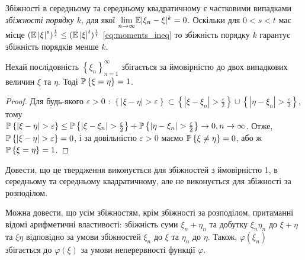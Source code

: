 \begin{remark}
    Збіжності в середньому та середньому квадратичному є частковими випадками \emph{збіжності порядку $k$}, для якої
$\underset{n \to \infty}{\lim} \E|\xi_n - \xi|^k = 0$. Оскільки 
для $0 < s < t$ має місце
$( \E \left| \xi\right|^s)^{\frac{1}{s}} \leq ( \E \left| \xi\right|^t)^{\frac{1}{t}}$ \eqref{eq:moments_ineq}
то збіжність порядку $k$ гарантує збіжність порядків менше $k$.
\end{remark}
\begin{proposition*}
     Нехай послідовність $\left\{ \xi_n\right\}_{n=1}^{\infty}$ збігається за ймовірністю до двох випадкових
    величин $\xi$ та $\eta$. Тоді $\P\left\{ \xi = \eta\right\} = 1$.
\end{proposition*}
\begin{proof}
    Для будь-якого $\varepsilon > 0$ : $\left\{ |\xi - \eta| > \varepsilon\right\} \subset 
    \left\{ |\xi - \xi_n| > \frac{\varepsilon}{2}\right\} \cup \left\{ |\eta - \xi_n| > \frac{\varepsilon}{2}\right\}$, тому \\
    $\P\left\{ |\xi - \eta| > \varepsilon\right\} \leq \P\left\{ |\xi - \xi_n| > \frac{\varepsilon}{2}\right\} + 
    \P\left\{ |\eta - \xi_n| > \frac{\varepsilon}{2}\right\} \to 0, n\to\infty$.
    Отже, $\P\left\{ |\xi - \eta| > \varepsilon\right\} = 0$, і за довільністю $\varepsilon > 0$ маємо $\P\left\{ \xi \neq \eta\right\} = 0$,
    або ж $\P\left\{ \xi = \eta\right\} = 1$.
\end{proof}
\begin{exercise}
    Довести, що це твердження виконується для збіжностей з ймовірністю 1, в середньому та середньому квадратичному, але не виконується
    для збіжності за розподілом.
\end{exercise}
Можна довести, що усім збіжностям, крім збіжності за розподілом, притаманні відомі арифметичні властивості: збіжність суми $\xi_n + \eta_n$ та добутку
$\xi_n \eta_n$ до $\xi + \eta$ та $\xi \eta$ відповідно за умови збіжностей $\xi_n$ до $\xi$ та $\eta_n$ до $\eta$. Також, $\varphi(\xi_n)$ збігається
до $\varphi(\xi)$ за умови неперервності функції $\varphi$.


